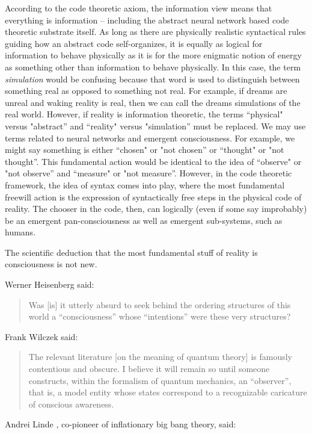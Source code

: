\documentclass[submission,copyright,creativecommons]{eptcs}
\begin{document}
According to the code theoretic axiom, the information view means that everything is information --
including the abstract neural network based code theoretic substrate itself. As long as there are physically realistic syntactical rules guiding how an abstract code self-organizes, it is equally as logical for information to behave physically as it is for the more enigmatic notion of energy as something other than information to behave physically. In this case, the term \textit{simulation} would be confusing because that word is used to distinguish between something real as opposed to something not real. For example, if dreams are unreal and waking reality is real, then we can call the dreams simulations of the real world. However, if reality is information theoretic, the terms “physical" versus "abstract” and “reality" versus "simulation” must be replaced. We may use terms related to neural networks and emergent consciousness. For example, we might say something is either “chosen" or "not chosen” or “thought" or "not thought”. This fundamental action would be identical to the idea of “observe" or "not observe” and “measure" or "not measure”. However, in the code theoretic framework, the idea of syntax comes into play, where the most fundamental freewill action is the expression of syntactically free steps in the physical code of reality. The chooser in the code, then, can logically (even if some say improbably) be an emergent pan-consciousness as well as emergent sub-systems, such as humans.

The scientific deduction that the most fundamental stuff of reality is consciousness is not new.

Werner Heisenberg \cite{ledewitz2011church} said:

\begin{quote}
    Was [is] it utterly absurd to seek behind the ordering structures of this world a “consciousness” whose “intentions” were these very structures?
\end{quote}
Frank Wilczek \cite{wilczek2006fantastic} said:

\begin{quote}
The relevant literature [on the meaning of quantum theory] is famously contentious and obscure. I believe it will remain so until someone constructs, within the formalism of quantum mechanics, an “observer”, that is, a model entity whose states correspond to a recognizable caricature of conscious awareness.
\end{quote}
Andrei Linde \cite{linder1990particle} , co-pioneer of inflationary big bang theory, said:
\end{document}

